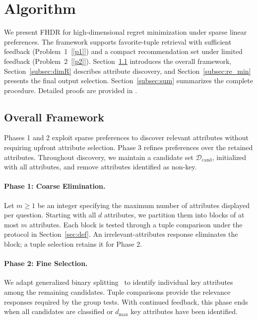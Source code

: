 \documentclass[conference]{IEEEtran}
\theoremstyle{definition}
\theoremstyle{plain}
\newcommand{\technicalreport}{\iftoggle{LinkTechnicalReport}{\href{https://github.com/JunyuLiao/High-dimensional-Regret-Minimization/blob/main/docs/TechnicalReport.pdf}{technical report}}{technical report}}
\begin{document}


\section{Algorithm}
\label{sec:alg}

We present \textsc{FHDR} for high-dimensional regret minimization under sparse linear preferences. The framework supports favorite-tuple retrieval with sufficient feedback (Problem~1~[\ref{p1}]) and a compact recommendation set under limited feedback (Problem~2~[\ref{p2}]). Section~\ref{subsec:framework} introduces the overall framework, Section~\ref{subsec:dimR} describes attribute discovery, and Section~\ref{subsec:re_min} presents the final output selection. Section~\ref{subsec:sum} summarizes the complete procedure. Detailed proofs are provided in \iftoggle{TechnicalReport}{Section~\ref{appen:proof} of the \technicalreport}{Appendix~\ref{appen:proof}}.

\subsection{Overall Framework}
\label{subsec:framework}

Phases 1 and 2 exploit sparse preferences to discover relevant attributes without requiring upfront attribute selection. Phase 3 refines preferences over the retained attributes. Throughout discovery, we maintain a candidate set $\mathcal{D}_\text{cand}$, initialized with all attributes, and remove attributes identified as non-key.

\paragraph{Phase 1: Coarse Elimination.}
Let $m\geq1$ be an integer specifying the maximum number of attributes displayed per question. Starting with all $d$ attributes, we partition them into blocks of at most $m$ attributes. Each block is tested through a tuple comparison under the protocol in Section~\ref{sec:def}. An irrelevant-attributes response eliminates the block; a tuple selection retains it for Phase 2.

\paragraph{Phase 2: Fine Selection.}
We adapt generalized binary splitting~\cite{hwang1972method} to identify individual key attributes among the remaining candidates. Tuple comparisons provide the relevance responses required by the group tests. With continued feedback, this phase ends when all candidates are classified or $d_\text{max}$ key attributes have been identified.
\end{document}
